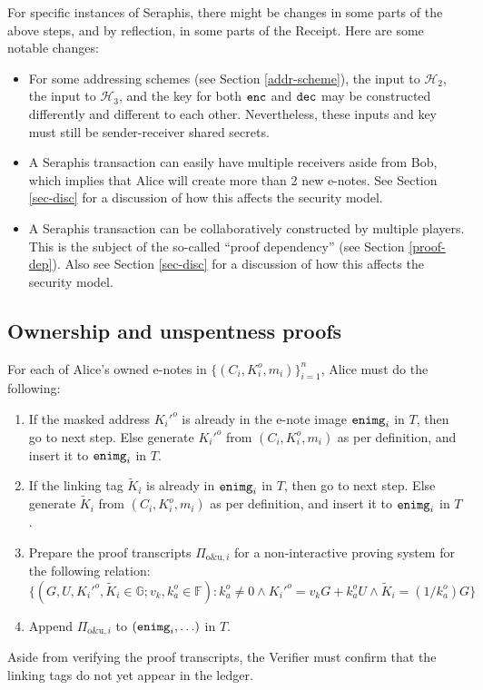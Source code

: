 \documentclass{article}
\begin{document}
For specific instances of Seraphis, there might be changes in some parts of the above steps, and by reflection, in some parts of the Receipt. Here are some notable changes:
\begin{itemize}
\item For some addressing schemes (see Section \ref{addr-scheme}), the input to $\mathcal{H}_2$, the input to $\mathcal{H}_3$, and the key for both ${\tt enc}$ and ${\tt dec}$ may be constructed differently and different to each other. Nevertheless, these inputs and key must still be sender-receiver shared secrets.
\item A Seraphis transaction can easily have multiple receivers aside from Bob, which implies that Alice will create more than 2 new e-notes. See Section \ref{sec-disc} for a discussion of how this affects the security model.
\item A Seraphis transaction can be collaboratively constructed by multiple players. This is the subject of the so-called ``proof dependency'' (see Section \ref{proof-dep}). Also see Section \ref{sec-disc} for a discussion of how this affects the security model.
\end{itemize}

\subsection{Ownership and unspentness proofs}
For each of Alice's owned e-notes in $\{(C_i,K_i^o,m_i)\}_{i=1}^n$, Alice must do the following:
\begin{enumerate}
    \item If the masked address $K_i'^o$ is already in the e-note image ${\tt enimg}_i$ in $T$, then go to next step. Else generate $K_i'^o$ from $(C_i, K_i^o, m_i)$ as per definition, and insert it to ${\tt enimg}_i$ in $T$.
    \item If the linking tag $\tilde{K}_i$ is already in ${\tt enimg}_i$ in $T$, then go to next step. Else generate $\tilde{K}_i$ from $(C_i, K_i^o, m_i)$ as per definition, and insert it to ${\tt enimg}_i$ in $T$.
    \item Prepare the proof transcripts $\Pi_{\text{o\&u}, i}$ for a non-interactive proving system for the following relation:
$$\{(G, U, K_i'^o, \tilde{K}_i\in\mathbb{G}; v_k, k_a^o\in\mathbb{F}): k_a^o \ne 0 \wedge K_i'^o = v_k G + k_a^o U \wedge \tilde{K}_i = (1/k_a^o)G \}$$
    \item Append $\Pi_{\text{o\&u}, i}$ to $({\tt enimg}_i, \ldots)$ in $T$.
\end{enumerate}
Aside from verifying the proof transcripts, the Verifier must confirm that the linking tags do not yet appear in the ledger.
\end{document}
